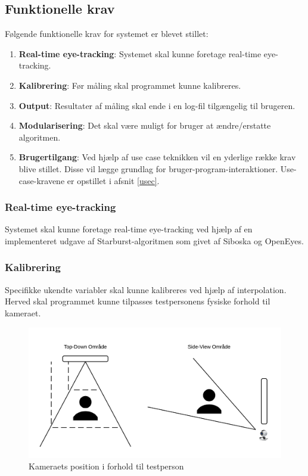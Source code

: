 \documentclass[rapport.tex]{subfiles}
\begin{document}
	\subsection{Funktionelle krav}
	Følgende funktionelle krav for systemet er blevet stillet: \\
	\begin{enumerate}
		\item 
		\textbf{Real-time eye-tracking}: Systemet skal kunne foretage real-time eye-tracking.
		\item 
		\textbf{Kalibrering}: Før måling skal programmet kunne kalibreres.
		\item
		\textbf{Output}: Resultater af måling skal ende i en log-fil tilgængelig til brugeren.
		\item
		\textbf{Modularisering}: Det skal være muligt for bruger at ændre/erstatte algoritmen.
		\item
		\textbf{Brugertilgang}: Ved hjælp af use case teknikken vil en yderlige række krav blive stillet. Disse vil lægge grundlag for bruger-program-interaktioner. Use-case-kravene er opstillet i afsnit \ref{usec}.  
	\end{enumerate}
	
	\subsubsection{Real-time eye-tracking}
	Systemet skal kunne foretage real-time eye-tracking ved hjælp af en implementeret udgave af Starburst-algoritmen som givet af Siboska og OpenEyes.
	\subsubsection{Kalibrering}
	Specifikke ukendte variabler skal kunne kalibreres ved hjælp af interpolation. Herved skal programmet kunne tilpasses testpersonens fysiske forhold til kameraet. 
	\begin{figure}[h]
		\centering
		\includegraphics[width=0.7\linewidth]{../Kamera-testperson}
		\caption{Kameraets position i forhold til testperson}
		\label{fig:Camposition}
	\end{figure}
	
\end{document}
